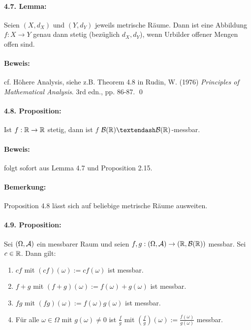 \documentclass[12pt]{report}
\begin{document}
 \paragraph{4.7. Lemma:}Seien $(X,d_X)$ und $(Y,d_Y)$ jeweils metrische R\"aume. Dann ist eine Abbildung $f:X\to Y$ genau dann stetig (bez\"uglich $d_X,d_Y$), wenn Urbilder offener Mengen offen sind.
 
 \paragraph{Beweis:}cf. H\"ohere Analysis, siehe z.B. Theorem 4.8 in Rudin, W. (1976) \textit{Principles of Mathematical Analysis}. 3rd edn., pp. 86-87. \qed
 
 \paragraph{4.8. Proposition:}Ist $f:\mathbb{R}\to\mathbb{R}$ stetig, dann ist $f$ $\borel\textendash\borel$-messbar. 
 
 \paragraph{Beweis:}folgt sofort aus Lemma 4.7 und Proposition 2.15. \qedsymbol
 
 \paragraph{Bemerkung:}Proposition 4.8 l\"asst sich auf beliebige metrische R\"aume ausweiten.
 
 \paragraph{4.9. Proposition:}Sei $(\Omega,\mathcal{A})$ ein messbarer Raum und seien $f,g:(\Omega,\mathcal{A})\to(\mathbb{R},\mathcal{B}(\mathbb{R}))$ messbar. Sei $c\in\mathbb{R}$. Dann gilt:
 \begin{enumerate}[label=(\roman*)]
     \item $cf$ mit $(cf)(\omega):=cf(\omega)$ ist messbar.
     \item $f+g$ mit $(f+g)(\omega):=f(\omega)+g(\omega)$ ist messbar.
     \item $fg$ mit $(fg)(\omega):=f(\omega)g(\omega)$ ist messbar.
     \item F\"ur alle $\omega\in\Omega$ mit $g(\omega)\neq0$ ist $\frac{f}{g}$ mit $\left(\frac{f}{g}\right)(\omega):=\frac{f(\omega)}{g(\omega)}$ messbar.
  \end{enumerate}
  
\end{document}
